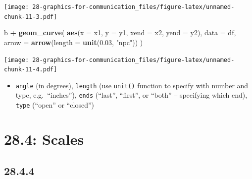 \documentclass[]{book}
\newenvironment{Shaded}{\begin{snugshade}}{\end{snugshade}}
\newcommand{\DataTypeTok}[1]{\textcolor[rgb]{0.13,0.29,0.53}{#1}}
\newcommand{\FloatTok}[1]{\textcolor[rgb]{0.00,0.00,0.81}{#1}}
\newcommand{\KeywordTok}[1]{\textcolor[rgb]{0.13,0.29,0.53}{\textbf{#1}}}
\newcommand{\NormalTok}[1]{#1}
\newcommand{\OperatorTok}[1]{\textcolor[rgb]{0.81,0.36,0.00}{\textbf{#1}}}
\newcommand{\StringTok}[1]{\textcolor[rgb]{0.31,0.60,0.02}{#1}}
\providecommand{\tightlist}{%
  \setlength{\itemsep}{0pt}\setlength{\parskip}{0pt}}
\theoremstyle{definition}
\theoremstyle{definition}
\theoremstyle{definition}
\theoremstyle{remark}
\begin{document}
\begin{enumerate}
  \texttt{[image: 28-graphics-for-communication\_files/figure-latex/unnamed-chunk-11-3.pdf]}

\begin{Shaded}
\begin{Highlighting}[]
\NormalTok{b }\OperatorTok{+}\StringTok{ }\KeywordTok{geom_curve}\NormalTok{(}
  \KeywordTok{aes}\NormalTok{(}\DataTypeTok{x =}\NormalTok{ x1, }\DataTypeTok{y =}\NormalTok{ y1, }\DataTypeTok{xend =}\NormalTok{ x2, }\DataTypeTok{yend =}\NormalTok{ y2),}
  \DataTypeTok{data =}\NormalTok{ df,}
  \DataTypeTok{arrow =} \KeywordTok{arrow}\NormalTok{(}\DataTypeTok{length =} \KeywordTok{unit}\NormalTok{(}\FloatTok{0.03}\NormalTok{, }\StringTok{"npc"}\NormalTok{))}
\NormalTok{)}
\end{Highlighting}
\end{Shaded}

  \texttt{[image: 28-graphics-for-communication\_files/figure-latex/unnamed-chunk-11-4.pdf]}

  \begin{itemize}
  \tightlist
  \item
    \texttt{angle} (in degrees), \texttt{length} (use \texttt{unit()}
    function to specify with number and type, e.g.~``inches''),
    \texttt{ends} (``last'', ``first'', or ``both'' -- specifying which
    end), \texttt{type} (``open'' or ``closed'')
  \end{itemize}
\end{enumerate}

\hypertarget{scales}{%
\section{28.4: Scales}\label{scales}}

\hypertarget{section-97}{%
\subsection{28.4.4}\label{section-97}}
\end{document}
